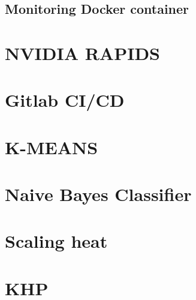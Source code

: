 \subsection{Monitoring Docker container}


\section{NVIDIA RAPIDS}


\section{Gitlab CI/CD}


\section{K-MEANS}


\section{Naive Bayes Classifier}


\section{Scaling heat}


\section{KHP}